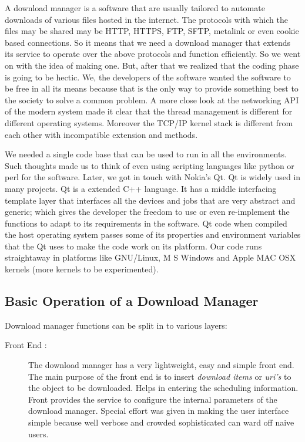 \documentclass[pdftex,12pt,a4paper,pdfencoding=unicode]{article}
\begin{document}
\begin{onehalfspace}
      A download manager is a software that are usually tailored to automate downloads of various files hosted in the internet. The
      protocols with which the files may be shared may be HTTP, HTTPS, FTP, SFTP, metalink or even cookie based connections. So it means
      that we need a download manager that extends its service to operate over the above protocols and function efficiently. So we went
      on with the idea of making one. But, after that we realized that the coding phase is going to be hectic. We, the developers of the
      software wanted the software to be free in all its means because that is the only way to provide something best to the society to
      solve a common problem. A more close look at the networking API of the modern system made it clear that the thread management is
      different for different operating systems. Moreover the TCP/IP kernel stack is different from each other with incompatible extension
      and methods.

      We needed a single code base that can be used to run in all the environments. Such thoughts made us to think of even using scripting
      languages like python or perl for the software. Later, we got in touch with Nokia's Qt. Qt is widely used in many projects. Qt is a
      extended C++ language. It has a middle interfacing template layer that interfaces all the devices and jobs that are very abstract and
      generic; which gives the developer the freedom to use or even re-implement the functions to adapt to its requirements in the software.
      Qt code when compiled the host operating system passes some of its properties and environment variables that the Qt uses to make the
      code work on its platform. Our code runs straightaway in platforms like GNU/Linux, M S Windows and Apple MAC OSX kernels (more kernels
      to be experimented).

      \subsection{Basic Operation of a Download Manager}
      Download manager functions can be split in to various layers:
      \begin{description}
        \item[Front End :] The download manager has a very lightweight, easy and simple front end. The main purpose of the front end is to
          insert \emph{download items} or \emph{uri's} to the object to be downloaded. Helps in entering the scheduling information.
          Front provides the service to configure the internal parameters of the download manager. Special effort was given in making the
          user interface simple because well verbose and crowded sophisticated can ward off naive users.


\end{description}
\end{onehalfspace}
\end{document}
